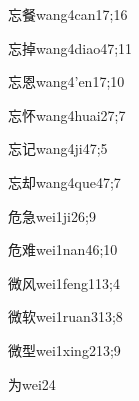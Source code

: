 \begin{verbete}{忘餐}{wang4can1}{7;16}
\end{verbete}

\begin{verbete}{忘掉}{wang4diao4}{7;11}
\end{verbete}

\begin{verbete}{忘恩}{wang4'en1}{7;10}
\end{verbete}

\begin{verbete}{忘怀}{wang4huai2}{7;7}
\end{verbete}

\begin{verbete}{忘记}{wang4ji4}{7;5}
\end{verbete}

\begin{verbete}{忘却}{wang4que4}{7;7}
\end{verbete}

\begin{verbete}{危急}{wei1ji2}{6;9}
\end{verbete}

\begin{verbete}{危难}{wei1nan4}{6;10}
\end{verbete}

\begin{verbete}{微风}{wei1feng1}{13;4}
\end{verbete}

\begin{verbete}{微软}{wei1ruan3}{13;8}
\end{verbete}

\begin{verbete}{微型}{wei1xing2}{13;9}
\end{verbete}

\begin{verbete}{为}{wei2}{4}
\end{verbete}

